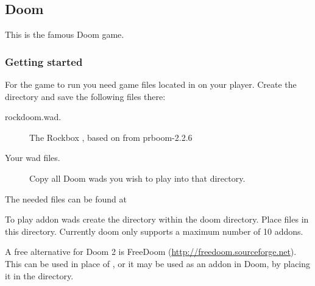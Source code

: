 \subsection{Doom}
This is the famous Doom game.

\subsubsection{Getting started}
For the game to run you need  game files located in
 on your player. Create the directory and save the
following files there:
\begin{description}
\item[rockdoom.wad.] The Rockbox , based on 
from prboom-2.2.6
\item[Your wad files.] Copy all Doom wads you wish to play into that directory.
\end{description}
The needed files can be found at

To play addon wads create the  directory within the doom directory.
Place  files in this directory. Currently doom only supports 
a maximum number of 10 addons.

A free alternative for Doom 2 is FreeDoom (\url{http://freedoom.sourceforge.net}).
This can be used in place of , or it may be used as an addon in 
Doom, by placing it in the  directory.

